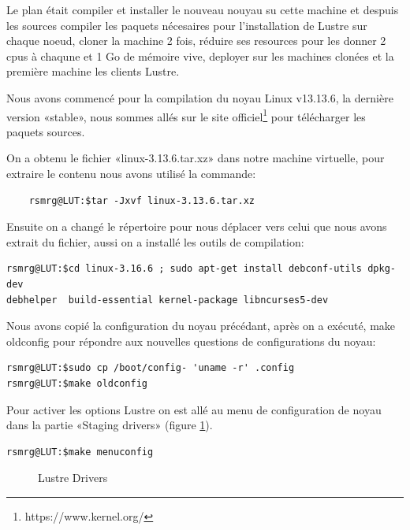 \documentclass[12pt]{article}
\begin{document}
Le plan était compiler et installer le nouveau nouyau su cette machine et despuis les sources compiler les paquets nécesaires pour l'installation de Lustre sur chaque noeud, cloner la machine 2 fois, réduire ses resources pour les donner 2 cpus à chaqune et 1 Go de mémoire vive, deployer sur les machines clonées et la première machine les clients Lustre.

Nous avons commencé pour la compilation du noyau Linux v13.13.6, la dernière version «stable», nous sommes allés sur le site officiel\footnote{https://www.kernel.org/} pour télécharger les paquets sources.

On a obtenu le fichier «linux-3.13.6.tar.xz» dans notre machine virtuelle, pour extraire le contenu nous avons utilisé la commande:

\begin{verbatim}
	rsmrg@LUT:$tar -Jxvf linux-3.13.6.tar.xz
\end{verbatim}

Ensuite on a changé le répertoire pour nous déplacer vers celui que nous avons extrait du fichier, aussi on a installé les outils de compilation:

\begin{verbatim}
rsmrg@LUT:$cd linux-3.16.6 ; sudo apt-get install debconf-utils dpkg-dev
debhelper  build-essential kernel-package libncurses5-dev
\end{verbatim}

Nous avons copié la configuration du noyau précédant, après on a exécuté, make oldconfig pour répondre aux nouvelles questions de configurations du noyau:

\begin{verbatim}
rsmrg@LUT:$sudo cp /boot/config- 'uname -r' .config
rsmrg@LUT:$make oldconfig
\end{verbatim}

Pour activer les options Lustre on est allé au menu de configuration de noyau dans la partie «Staging drivers» (figure \ref{kernel}).

\begin{verbatim}
rsmrg@LUT:$make menuconfig
\end{verbatim}

\begin{figure}[Lustre Options]
\caption{Lustre Drivers}
\label{kernel}
\end{figure}
\end{document}

